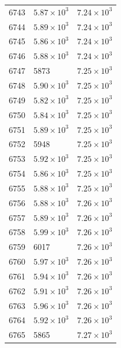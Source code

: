 \begin{table}[H]
\begin{tabular}{lll}
6743 & $\displaystyle 5.87 \times 10^{3}$ & $\displaystyle 7.24 \times 10^{3}$ \\
6744 & $\displaystyle 5.89 \times 10^{3}$ & $\displaystyle 7.24 \times 10^{3}$ \\
6745 & $\displaystyle 5.86 \times 10^{3}$ & $\displaystyle 7.24 \times 10^{3}$ \\
6746 & $\displaystyle 5.88 \times 10^{3}$ & $\displaystyle 7.24 \times 10^{3}$ \\
6747 & 5873 & $\displaystyle 7.25 \times 10^{3}$ \\
6748 & $\displaystyle 5.90 \times 10^{3}$ & $\displaystyle 7.25 \times 10^{3}$ \\
6749 & $\displaystyle 5.82 \times 10^{3}$ & $\displaystyle 7.25 \times 10^{3}$ \\
6750 & $\displaystyle 5.84 \times 10^{3}$ & $\displaystyle 7.25 \times 10^{3}$ \\
6751 & $\displaystyle 5.89 \times 10^{3}$ & $\displaystyle 7.25 \times 10^{3}$ \\
6752 & 5948 & $\displaystyle 7.25 \times 10^{3}$ \\
6753 & $\displaystyle 5.92 \times 10^{3}$ & $\displaystyle 7.25 \times 10^{3}$ \\
6754 & $\displaystyle 5.86 \times 10^{3}$ & $\displaystyle 7.25 \times 10^{3}$ \\
6755 & $\displaystyle 5.88 \times 10^{3}$ & $\displaystyle 7.25 \times 10^{3}$ \\
6756 & $\displaystyle 5.88 \times 10^{3}$ & $\displaystyle 7.26 \times 10^{3}$ \\
6757 & $\displaystyle 5.89 \times 10^{3}$ & $\displaystyle 7.26 \times 10^{3}$ \\
6758 & $\displaystyle 5.99 \times 10^{3}$ & $\displaystyle 7.26 \times 10^{3}$ \\
6759 & 6017 & $\displaystyle 7.26 \times 10^{3}$ \\
6760 & $\displaystyle 5.97 \times 10^{3}$ & $\displaystyle 7.26 \times 10^{3}$ \\
6761 & $\displaystyle 5.94 \times 10^{3}$ & $\displaystyle 7.26 \times 10^{3}$ \\
6762 & $\displaystyle 5.91 \times 10^{3}$ & $\displaystyle 7.26 \times 10^{3}$ \\
6763 & $\displaystyle 5.96 \times 10^{3}$ & $\displaystyle 7.26 \times 10^{3}$ \\
6764 & $\displaystyle 5.92 \times 10^{3}$ & $\displaystyle 7.26 \times 10^{3}$ \\
6765 & 5865 & $\displaystyle 7.27 \times 10^{3}$ \\

\end{tabular}
\end{table}
